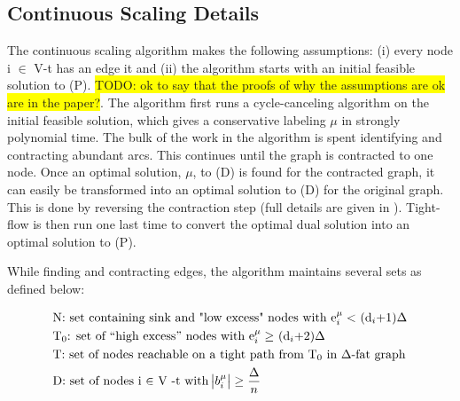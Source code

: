 \documentclass[11pt]{article}
\theoremstyle{definition}
\theoremstyle{definition}
\newcommand{\todo}[1]{\colorbox{yellow}{TODO: #1}}
\begin{document}
\subsection{Continuous Scaling Details}
The continuous scaling algorithm makes the following assumptions: (i) every node i $\in$ V-t has an edge it and (ii) the algorithm starts with an initial feasible solution to (P). \todo{ok to say that the proofs of why the assumptions are ok are in the paper?}. The algorithm first runs a cycle-canceling algorithm on the initial feasible solution, which gives a conservative labeling $\mu$ in strongly polynomial time. The bulk of the work in the algorithm is spent identifying and contracting abundant arcs. This continues until the graph is contracted to one node. Once an optimal solution, $\mu$, to (D) is found for the contracted graph, it can easily be transformed into an optimal solution to (D) for the original graph. This is done by reversing the contraction step (full details are given in \cite{article}). Tight-flow is then run one last time to convert the optimal dual solution into an optimal solution to (P).

While finding and contracting edges, the algorithm maintains several sets as defined below:

\begin{align*}
&\text{N: set containing sink and "low excess" nodes with e$_i^\mu <$ (d$_i$+1)$\Delta$} \\
&\text{T$_0$: set of ``high excess'' nodes with e$_i^\mu \geq$ (d$_i$+2)$\Delta$} \\
&\text{T: set of nodes reachable on a tight path from T$_0$ in $\Delta$-fat graph} \\ 
&\text{D: set of nodes i $\in$ V -t with $\abs{b_i^\mu} \geq \frac{\Delta}{n}$}
\end{align*}
\end{document}
